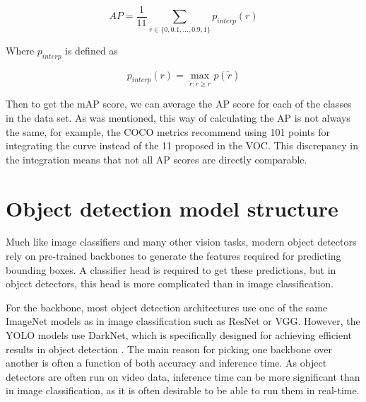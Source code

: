 \[AP = \frac{1} {11} \sum_{r \in \{0, 0.1, \ldots, 0.9 , 1\}}{p_{interp}(r)}\] \noindent

Where $p_{interp}$ is defined as

\[p_{interp}(r) = \max \limits_{\tilde{r}:\tilde{r} \geq r} p(\tilde{r})\]

Then to get the mAP score, we can average the AP score for each of the classes in the data set.
As was mentioned, this way of calculating the AP is not always the same, for example, the COCO metrics \citep{COCO_SITE} recommend using 101 points for integrating the curve instead of the 11 proposed in the VOC.
This discrepancy in the integration means that not all AP scores are directly comparable.

\section{Object detection model structure}
Much like image classifiers and many other vision tasks, modern object detectors rely on pre-trained backbones to generate the features required for predicting bounding boxes.
A classifier head is required to get these predictions, but in object detectors, this head is more complicated than in image classification.

For the backbone, most object detection architectures use one of the same ImageNet models as in image classification such as ResNet or VGG.
However, the YOLO models use DarkNet, which is specifically designed for achieving efficient results in object detection \citep{yolov4}.
The main reason for picking one backbone over another is often a function of both accuracy and inference time.
As object detectors are often run on video data, inference time can be more significant than in image classification, as it is often desirable to be able to run them in real-time.

